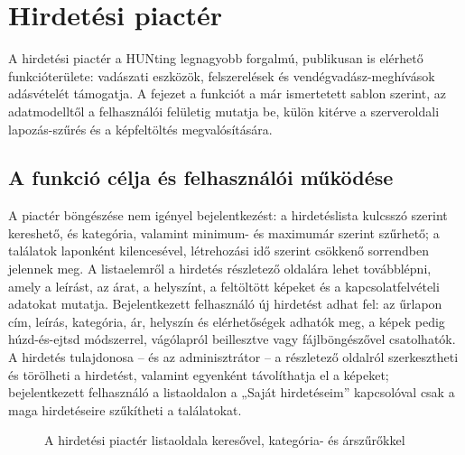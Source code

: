 
\chapter{Hirdetési piactér}
\label{chap:hirdetesek}

A hirdetési piactér a HUNting legnagyobb forgalmú, publikusan is elérhető funkcióterülete:
vadászati eszközök, felszerelések és vendégvadász-meghívások adásvételét támogatja. A fejezet a
funkciót a már ismertetett sablon szerint, az adatmodelltől a felhasználói felületig mutatja be,
külön kitérve a szerveroldali lapozás-szűrés és a képfeltöltés megvalósítására.

\section{A funkció célja és felhasználói működése}
\label{sec:ads-cel}

A piactér böngészése nem igényel bejelentkezést: a hirdetéslista kulcsszó szerint kereshető, és
kategória, valamint minimum- és maximumár szerint szűrhető; a találatok laponként kilencesével,
létrehozási idő szerint csökkenő sorrendben jelennek meg. A listaelemről a hirdetés részletező
oldalára lehet továbblépni, amely a leírást, az árat, a helyszínt, a feltöltött képeket és a
kapcsolatfelvételi adatokat mutatja. Bejelentkezett felhasználó új hirdetést adhat fel: az űrlapon
cím, leírás, kategória, ár, helyszín és elérhetőségek adhatók meg, a képek pedig húzd-és-ejtsd
módszerrel, vágólapról beillesztve vagy fájlböngészővel csatolhatók. A hirdetés tulajdonosa -- és
az adminisztrátor -- a részletező oldalról szerkesztheti és törölheti a hirdetést, valamint
egyenként távolíthatja el a képeket; bejelentkezett felhasználó a listaoldalon a „Saját
hirdetéseim” kapcsolóval csak a maga hirdetéseire szűkítheti a találatokat.

\begin{figure}[htbp]
	\centering
	\caption{A hirdetési piactér listaoldala keresővel, kategória- és árszűrőkkel}
	\label{fig:ads-list-screen}
\end{figure}

